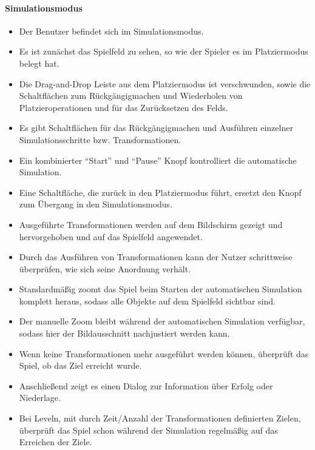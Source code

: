 \paragraph{Simulationsmodus}\mbox{}\newline
\begin{itemize}
\item Der Benutzer befindet sich im Simulationsmodus.
\item Es ist zunächst das Spielfeld zu sehen, so wie der Spieler es im Platziermodus belegt hat.
\item Die Drag-and-Drop Leiste aus dem Platziermodus ist verschwunden, sowie die 
Schaltflächen zum Rückgängigmachen und Wiederholen von 
Platzieroperationen und für das Zurücksetzen des Felds.
\item Es gibt Schaltflächen für das Rückgängigmachen und Ausführen 
einzelner Simulationsschritte bzw. Transformationen.
\item Ein kombinierter "`Start"' und "`Pause"' Knopf kontrolliert die automatische Simulation.
\item Eine Schaltfläche, die zurück in den Platziermodus führt, ersetzt den Knopf zum Übergang 
in den Simulationsmodus.
\item Ausgeführte Transformationen werden auf dem Bildschirm gezeigt und hervorgehoben und auf das Spielfeld angewendet.
\item Durch das Ausführen von Transformationen kann der Nutzer schrittweise
überprüfen, wie sich seine Anordnung verhält.
\item Standardmäßig zoomt das Spiel beim Starten der automatischen Simulation komplett heraus, sodass alle Objekte auf dem Spielfeld sichtbar sind.
\item Der manuelle Zoom bleibt während der automatischen Simulation verfügbar, sodass hier der Bildausschnitt nachjustiert werden kann.
\item Wenn keine Transformationen mehr ausgeführt werden können, überprüft das Spiel, ob das Ziel erreicht
wurde.
\item Anschließend zeigt es einen Dialog zur Information über Erfolg oder Niederlage.
\item Bei Leveln, mit durch Zeit/Anzahl der Transformationen definierten Zielen,
überprüft das Spiel schon während der Simulation regelmäßig auf das Erreichen
der Ziele.
\end{itemize}

